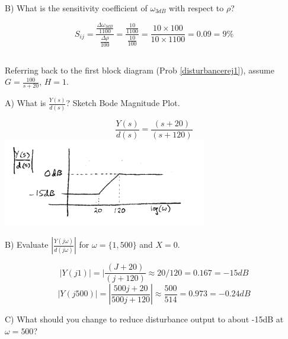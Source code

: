 \documentclass{article}	%
\begin{document}
B) What is the sensitivity coefficient  of $\omega_{3dB}$ with respect to $\rho$?

\begin{solution}
\[
S_{ij} = \frac  {\frac{\Delta\omega_{3dB}}  {1100} } {\frac{\Delta\rho}{100}} = 
\frac {\frac{10}{1100}} {\frac{10}{100}} 
= \frac{10\times100}{10\times 1100} = 0.09 = 9\%
\]
\end{solution}


\subsection{}
 Referring back to the first block diagram (Prob \ref{disturbancerej1}), assume $G=\frac{100}{s+20}$, $H=1$.

A) What is $\frac{Y(s)}{d(s)}$?   Sketch Bode Magnitude Plot.

\begin{solution}
\[
\frac{Y(s)}{d(s)} = \frac{(s+20)}{(s+120)}
\]
\includegraphics[width=3.5in]{00566a.png}
\end{solution}

B) Evaluate $|\frac{Y(j\omega)}{d(j\omega)}|$ for $\omega = \{1, 500\}$ and $X=0$.

\begin{solution}
\[
|Y(j1)| = |\frac{(J+20)}{(j+120)} \approx 20/120 = 0.167 = -15dB
\]
\[
|Y(j500)| = |\frac {500j+20} {500j+120} | \approx \frac{500}{514} = 0.973 = -0.24dB
\]

\end{solution}

C) What should you change to reduce disturbance output to about -15dB at $\omega=500$?
\end{document}
